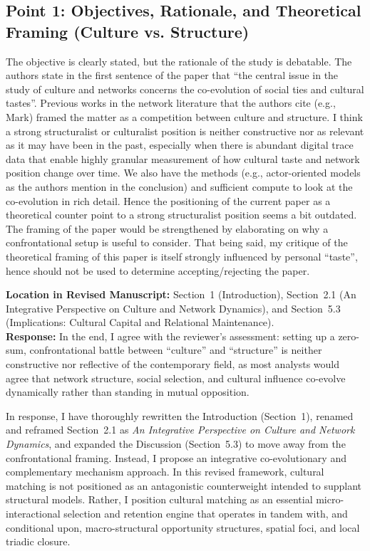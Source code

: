 \documentclass[11pt]{article}
\begin{document}
\subsection*{Point 1: Objectives, Rationale, and Theoretical Framing (Culture vs. Structure)}

\begin{reviewercomment}
The objective is clearly stated, but the rationale of the study is debatable. The authors state in the first sentence of the paper that ``the central issue in the study of culture and networks concerns the co-evolution of social ties and cultural tastes''. Previous works in the network literature that the authors cite (e.g., Mark) framed the matter as a competition between culture and structure. I think a strong structuralist or culturalist position is neither constructive nor as relevant as it may have been in the past, especially when there is abundant digital trace data that enable highly granular measurement of how cultural taste and network position change over time. We also have the methods (e.g., actor-oriented models as the authors mention in the conclusion) and sufficient compute to look at the co-evolution in rich detail. Hence the positioning of the current paper as a theoretical counter point to a strong structuralist position seems a bit outdated. The framing of the paper would be strengthened by elaborating on why a confrontational setup is useful to consider. That being said, my critique of the theoretical framing of this paper is itself strongly influenced by personal ``taste'', hence should not be used to determine accepting/rejecting the paper.
\end{reviewercomment}

\noindent\textbf{Location in Revised Manuscript:} Section~1 (Introduction), Section~2.1 (An Integrative Perspective on Culture and Network Dynamics), and Section~5.3 (Implications: Cultural Capital and Relational Maintenance).\\[4pt]
\textbf{Response:} In the end, I agree with the reviewer's assessment: setting up a zero-sum, confrontational battle between ``culture'' and ``structure'' is neither constructive nor reflective of the contemporary field, as most analysts would agree that network structure, social selection, and cultural influence co-evolve dynamically rather than standing in mutual opposition.

In response, I have thoroughly rewritten the Introduction (Section~1), renamed and reframed Section~2.1 as \textit{An Integrative Perspective on Culture and Network Dynamics}, and expanded the Discussion (Section~5.3) to move away from the confrontational framing. Instead, I propose an integrative co-evolutionary and complementary mechanism approach. In this revised framework, cultural matching is not positioned as an antagonistic counterweight intended to supplant structural models. Rather, I position cultural matching as an essential micro-interactional selection and retention engine that operates in tandem with, and conditional upon, macro-structural opportunity structures, spatial foci, and local triadic closure. 
\end{document}
